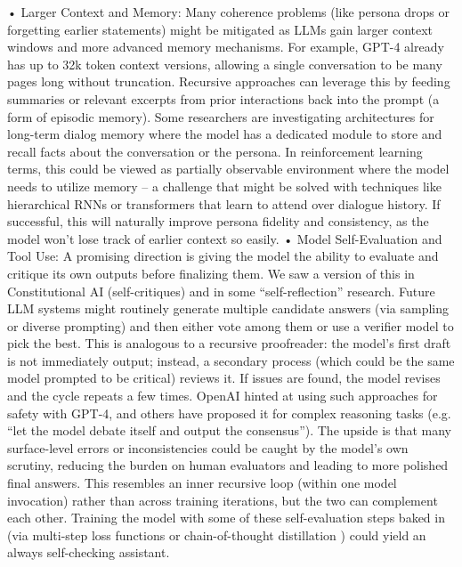 \documentclass{article}
\begin{document}
	•	Larger Context and Memory: Many coherence problems (like persona drops or forgetting earlier statements) might be mitigated as LLMs gain larger context windows and more advanced memory mechanisms. For example, GPT-4 already has up to 32k token context versions, allowing a single conversation to be many pages long without truncation. Recursive approaches can leverage this by feeding summaries or relevant excerpts from prior interactions back into the prompt (a form of episodic memory). Some researchers are investigating architectures for long-term dialog memory where the model has a dedicated module to store and recall facts about the conversation or the persona. In reinforcement learning terms, this could be viewed as partially observable environment where the model needs to utilize memory – a challenge that might be solved with techniques like hierarchical RNNs or transformers that learn to attend over dialogue history. If successful, this will naturally improve persona fidelity and consistency, as the model won’t lose track of earlier context so easily.
	•	Model Self-Evaluation and Tool Use: A promising direction is giving the model the ability to evaluate and critique its own outputs before finalizing them. We saw a version of this in Constitutional AI (self-critiques) and in some “self-reflection” research. Future LLM systems might routinely generate multiple candidate answers (via sampling or diverse prompting) and then either vote among them or use a verifier model to pick the best. This is analogous to a recursive proofreader: the model’s first draft is not immediately output; instead, a secondary process (which could be the same model prompted to be critical) reviews it. If issues are found, the model revises and the cycle repeats a few times. OpenAI hinted at using such approaches for safety with GPT-4, and others have proposed it for complex reasoning tasks (e.g. “let the model debate itself and output the consensus”). The upside is that many surface-level errors or inconsistencies could be caught by the model’s own scrutiny, reducing the burden on human evaluators and leading to more polished final answers. This resembles an inner recursive loop (within one model invocation) rather than across training iterations, but the two can complement each other. Training the model with some of these self-evaluation steps baked in (via multi-step loss functions or chain-of-thought distillation ) could yield an always self-checking assistant.
\end{document}
